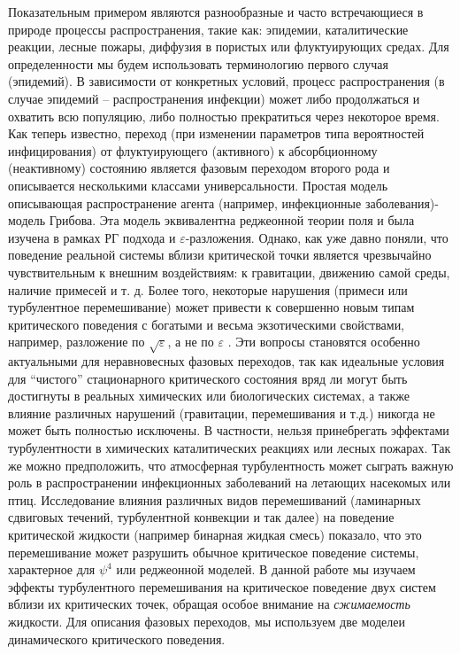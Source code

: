 \documentclass[a4paper,10pt]{article}
\begin{document}
Показательным примером являются разнообразные и часто
встречающиеся в природе процессы распространения, такие как:
эпидемии, каталитические реакции, лесные пожары, диффузия в
пористых или флуктуирующих средах. Для определенности мы будем
использовать терминологию первого случая (эпидемий). В зависимости
от конкретных условий, процесс распространения (в случае эпидемий
-- распространения инфекции) может либо продолжаться и охватить
всю популяцию, либо полностью прекратиться через некоторое время. Как теперь
известно, переход (при изменении параметров типа вероятностей
инфицирования) от флуктуирующего (активного) к абсорбционному
(неактивному) состоянию является фазовым переходом второго рода и
описывается несколькими классами универсальности.
Простая модель описывающая распространение агента 
(например, инфекционные заболевания)-модель Грибова.
Эта модель эквивалентна реджеонной теории поля и
была изучена в рамках  РГ подхода и $\varepsilon$-разложения.
Однако, как уже давно поняли, что поведение реальной системы вблизи 
критической точки является чрезвычайно чувствительным к внешним воздействиям:
 к гравитации, движению самой среды, наличие примесей и т. д.
Более того, некоторые нарушения (примеси или турбулентное 
перемешивание) может привести к совершенно новым типам критического поведения с богатыми и
 весьма экзотическими свойствами, например, разложение по $\sqrt{\varepsilon}$, а не по $\varepsilon$ 
 \cite{quench,Satten}.
Эти вопросы становятся особенно актуальными для неравновесных фазовых переходов, так как идеальные условия 
для ``чистого'' стационарного критического состояния вряд ли могут быть достигнуты в реальных химических или биологических
 системах, а также влияние различных нарушений (гравитации, перемешивания и т.д.) никогда не может быть полностью исключены.
В частности, нельзя принебрегать эффектами турбулентности
 в химических каталитических реакциях или лесных пожарах.
Так же можно предположить, что атмосферная турбулентность может сыграть важную роль в распространении 
инфекционных заболеваний на летающих насекомых или птиц.
Исследование влияния различных видов перемешиваний (ламинарных сдвиговых течений,
 турбулентной конвекции и так далее) на поведение критической жидкости (например бинарная жидкая смесь)
 показало, что это перемешивание может разрушить обычное критическое поведение системы, характерное для $\psi^{4}$ 
или реджеонной моделей.
В данной работе мы изучаем эффекты турбулентного перемешивания на критическое поведение двух систем вблизи их
 критических точек, обращая особое внимание на {\it сжимаемость} жидкости.
Для описания фазовых переходов, мы используем две  моделеи динамического критического поведения.
\end{document}
